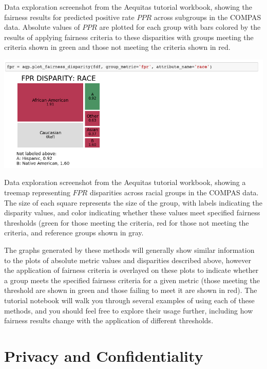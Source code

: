 \documentclass[]{krantz}
\begin{document}
Data exploration screenshot from the Aequitas tutorial workbook, showing
the fairness results for predicted positive rate \(PPR\) across
subgroups in the COMPAS data. Absolute values of \(PPR\) are plotted for
each group with bars colored by the results of applying fairness
criteria to these disparities with groups meeting the criteria shown in
green and those not meeting the criteria shown in red.

\begin{center}\includegraphics[width=1\linewidth]{ChapterBias/figures/tutorial_plot_fairness2} \end{center}

Data exploration screenshot from the Aequitas tutorial workbook, showing
a treemap representing \(FPR\) disparities across racial groups in the
COMPAS data. The size of each square represents the size of the group,
with labels indicating the disparity values, and color indicating
whether these values meet specified fairness thresholds (green for those
meeting the criteria, red for those not meeting the criteria, and
reference groups shown in gray.

The graphs generated by these methods will generally show similar
information to the plots of absolute metric values and disparities
described above, however the application of fairness criteria is
overlayed on these plots to indicate whether a group meets the specified
fairness criteria for a given metric (those meeting the threshold are
shown in green and those failing to meet it are shown in red). The
tutorial notebook will walk you through several examples of using each
of these methods, and you should feel free to explore their usage
further, including how fairness results change with the application of
different thresholds.

\hypertarget{chap:privacy}{\chapter{Privacy and
Confidentiality}\label{chap:privacy}}
\end{document}
